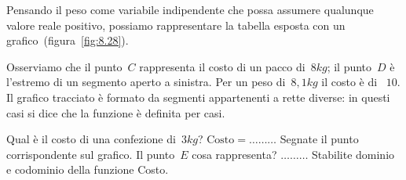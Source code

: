 \begin{soluzione}
Pensando il peso come variabile indipendente che possa assumere qualunque valore reale positivo, possiamo rappresentare la
tabella esposta con un grafico~(figura~\ref{fig:8.28}).

Osserviamo che il punto~$C$ rappresenta il costo di un pacco di~$8\unit{kg}$; il punto~$D$ è l'estremo di un segmento aperto a sinistra.
Per un peso di~$8,1\unit{kg}$ il costo è di \officialeuro~$10$.
Il grafico tracciato è formato da segmenti appartenenti a rette diverse: in questi casi si dice che la funzione è definita per casi.

Qual è il costo di una confezione di~$3\unit{kg}$? $\text{Costo}=\ldots \ldots\ldots$ Segnate il punto corrispondente sul grafico.
Il punto~$E$ cosa rappresenta? $\ldots \ldots \ldots$
Stabilite dominio e codominio della funzione Costo.
\end{soluzione}

\begin{figure}[htb]
\begin{minipage}[b]{.45\textwidth}
\centering
\caption{}\label{fig:8.28}
\end{minipage}\hfil
\begin{minipage}[b]{.45\textwidth}
\centering
\caption{}\label{fig:8.29}
\end{minipage}
\end{figure}

